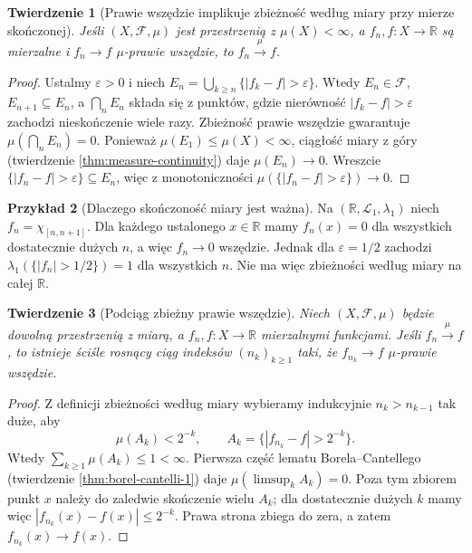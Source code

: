 \documentclass[11pt,a4paper,oneside]{book}
\numberwithin{equation}{chapter}
\theoremstyle{plain}
\newtheorem{twierdzenie}{Twierdzenie}[chapter]
\theoremstyle{definition}
\newtheorem{przyklad}[twierdzenie]{Przykład}
\theoremstyle{remark}
\begin{document}
\begin{twierdzenie}[Prawie wszędzie implikuje zbieżność według miary przy mierze skończonej]
\label{thm:ae-to-measure-finite}
Jeśli $(X,\mathcal F,\mu)$ jest przestrzenią
z $\mu(X)<\infty$, a $f_n,f:X\to\mathbb R$ są
mierzalne i $f_n\to f$ $\mu$-prawie wszędzie,
to $f_n\xrightarrow{\mu}f$.
\end{twierdzenie}
\begin{proof}
Ustalmy $\varepsilon>0$ i niech
$E_n=\bigcup_{k\ge n}\{|f_k-f|>\varepsilon\}$.
Wtedy $E_n\in\mathcal F$, $E_{n+1}\subseteq E_n$,
a $\bigcap_nE_n$ składa się z punktów, gdzie
nierówność $|f_k-f|>\varepsilon$ zachodzi
nieskończenie wiele razy. Zbieżność prawie wszędzie
gwarantuje $\mu(\bigcap_nE_n)=0$.
Ponieważ $\mu(E_1)\le\mu(X)<\infty$,
ciągłość miary z góry (twierdzenie
\ref{thm:measure-continuity}) daje $\mu(E_n)\to0$.
Wreszcie $\{|f_n-f|>\varepsilon\}\subseteq E_n$,
więc z monotoniczności $\mu(\{|f_n-f|>\varepsilon\})\to0$.
\end{proof}

\begin{przyklad}[Dlaczego skończoność miary jest ważna]
\label{ex:aenotmeasure}
Na $(\mathbb R,\mathcal L_1,\lambda_1)$ niech
$f_n=\chi_{[n,n+1]}$. Dla każdego ustalonego
$x\in\mathbb R$ mamy $f_n(x)=0$ dla wszystkich
dostatecznie dużych $n$, a więc $f_n\to0$ wszędzie.
Jednak dla $\varepsilon=1/2$ zachodzi
$\lambda_1(\{|f_n|>1/2\})=1$ dla wszystkich $n$.
Nie ma więc zbieżności według miary na całej $\mathbb R$.
\end{przyklad}

\begin{twierdzenie}[Podciąg zbieżny prawie wszędzie]
\label{thm:measure-subsequence}
Niech $(X,\mathcal F,\mu)$ będzie dowolną przestrzenią
z miarą, a $f_n,f:X\to\mathbb R$ mierzalnymi funkcjami.
Jeśli $f_n\xrightarrow{\mu}f$, to istnieje ściśle
rosnący ciąg indeksów $(n_k)_{k\ge1}$ taki, że
$f_{n_k}\to f$ $\mu$-prawie wszędzie.
\end{twierdzenie}
\begin{proof}
Z definicji zbieżności według miary wybieramy
indukcyjnie $n_k>n_{k-1}$ tak duże, aby
\[
\mu(A_k)<2^{-k},\qquad
A_k=\{|f_{n_k}-f|>2^{-k}\}.
\]
Wtedy $\sum_{k\ge1}\mu(A_k)\le1<\infty$.
Pierwsza część lematu Borela--Cantellego
(twierdzenie \ref{thm:borel-cantelli-1})
daje $\mu(\limsup_k A_k)=0$.
Poza tym zbiorem punkt $x$ należy do zaledwie
skończenie wielu $A_k$; dla dostatecznie dużych $k$
mamy więc $|f_{n_k}(x)-f(x)|\le2^{-k}$.
Prawa strona zbiega do zera, a zatem
$f_{n_k}(x)\to f(x)$.
\end{proof}
\end{document}
